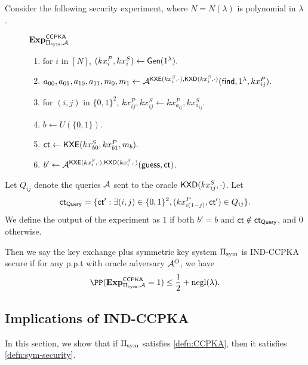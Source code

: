 \begin{definition}
Consider the following security experiment, where $N = N(\lambda)$ is polynomial in $\lambda$.
\begin{figure}[h!]
\begin{framed}
$\mathbf{Exp}^{\mathsf{CCPKA}}_{\Pi_{\text{sym}}, \mathcal{A}}$
\begin{enumerate}
    \item for $i$ in $[N]$, $(kx_{i}^P, kx_{i}^S) \leftarrow \mathsf{Gen}(1^{\lambda}).$
    \item $a_{00}, a_{01}, a_{10}, a_{11}, m_0, m_1 \leftarrow \mathcal{A}^{\mathsf{KXE}(kx_{i}^S, \cdot), \mathsf{KXD}(kx_{i}^S, \cdot)}(\mathsf{find}, 1^{\lambda}, kx_{ij}^P).$
    \item for $(i, j)$ in $\{0, 1\}^2$, $kx^{P}_{ij}, kx^S_{ij} \leftarrow kx^P_{a_{ij}}, kx^S_{a_{ij}}$. 
    \item $b \leftarrow U(\{0, 1\})$.
    \item $\mathsf{ct} \leftarrow \mathsf{KXE}(kx_{b0}^S, kx_{b1}^P, m_b).$
    \item $b' \leftarrow \mathcal{A}^{\mathsf{KXE}(kx_{i}^S, \cdot), \mathsf{KXD}(kx_{i}^S, \cdot)}(\mathsf{guess}, \mathsf{ct})$.
\end{enumerate}
\end{framed}
\end{figure}

Let $Q_{ij}$ denote the queries $\mathcal{A}$ sent to the oracle $\mathsf{KXD}(kx_{ij}^S, \cdot)$. Let
$$\mathsf{ct}_{\mathsf{Query}} = \{\mathsf{ct}': \exists (i,j) \in \{0, 1\}^2, (kx_{i(1 - j)}^P, \mathsf{ct}') \in Q_{ij}\}.$$
We define the output of the experiment as $1$ if both $b' = b$ and $\mathsf{ct} \notin \mathsf{ct}_{\mathsf{Query}}$, and $0$ otherwise. 

Then we say the key exchange plus symmetric key system $\Pi_{\text{sym}}$ is IND-CCPKA secure if for any p.p.t with oracle adversary $\mathcal{A}^O$, we have
$$\PP(\mathbf{Exp}^{\mathsf{CCPKA}}_{\Pi_{\sym}, \cA} = 1) \leq \frac{1}{2} + \negl(\lambda).$$
\end{definition}
\subsection{Implications of IND-CCPKA}
In this section, we show that if $\Pi_{\text{sym}}$ satisfies \cref{defn:CCPKA}, then it satisfies \cref{defn:sym-security}.

